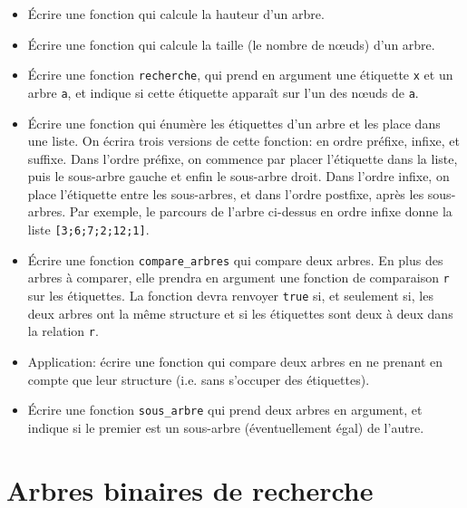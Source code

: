 \documentclass[11pt, a4paper]{article}
\begin{document}
\begin{itemize}

  \item Écrire une fonction qui calcule la hauteur d'un arbre.

  \item Écrire une fonction qui calcule la taille (le nombre de nœuds)
        d'un arbre.

  \item Écrire une fonction {\tt recherche}, qui prend en argument une
        étiquette {\tt x} et un arbre {\tt a}, et indique si cette
        étiquette apparaît sur l'un des nœuds de {\tt a}.

  \item Écrire une fonction qui énumère les étiquettes d'un arbre et
        les place dans une liste. On écrira trois versions de cette
        fonction: en ordre préfixe, infixe, et suffixe. Dans l'ordre
        préfixe, on commence par placer l'étiquette dans la liste,
        puis le sous-arbre gauche et enfin le sous-arbre droit. Dans
        l'ordre infixe, on place l'étiquette entre les sous-arbres, et
        dans l'ordre postfixe, après les sous-arbres. Par exemple, le
        parcours de l'arbre ci-dessus en ordre infixe donne la liste
        \texttt{[3;6;7;2;12;1]}.

  \item Écrire une fonction {\tt compare\_arbres} qui compare deux
        arbres. En plus des arbres à comparer, elle prendra en
        argument une fonction de comparaison {\tt r} sur les
        étiquettes. La fonction devra renvoyer {\tt true} si, et
        seulement si, les deux arbres ont la même structure et si les
        étiquettes sont deux à deux dans la relation {\tt r}.

  \item Application: écrire une fonction qui compare deux arbres en ne
        prenant en compte que leur structure (i.e.  sans s'occuper des
        étiquettes).

  \item Écrire une fonction {\tt sous\_arbre} qui prend deux arbres en
        argument, et indique si le premier est un sous-arbre
        (éventuellement égal) de l'autre.

\end{itemize}


\section{Arbres binaires de recherche}
\end{document}
